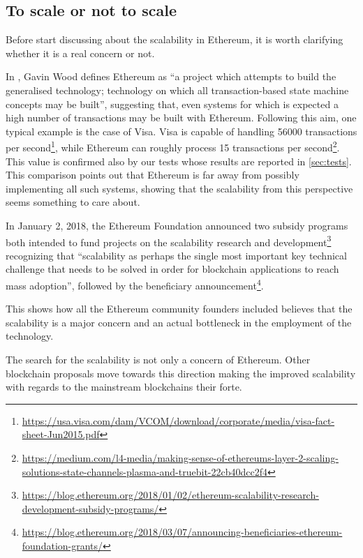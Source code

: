 \subsection{To scale or not to scale}
\label{sec:to-scale-or-not}

Before start discussing about the scalability in Ethereum, it is worth
clarifying whether it is a real concern or not.

In \cite{wood2018ethereum}, Gavin Wood defines Ethereum as ``a project which
attempts to build the generalised technology; technology on which all
transaction-based state machine concepts may be built'', suggesting that, even
systems for which is expected a high number of transactions may be built with
Ethereum. Following this aim, one typical example is the case of Visa. Visa is
capable of handling 56000 transactions per
second\footnote{\url{https://usa.visa.com/dam/VCOM/download/corporate/media/visa-fact-sheet-Jun2015.pdf}},
while Ethereum can roughly process 15 transactions per
second\footnote{\url{https://medium.com/l4-media/making-sense-of-ethereums-layer-2-scaling-solutions-state-channels-plasma-and-truebit-22cb40dcc2f4}}.
This value is confirmed also by our tests whose results are reported in
\autoref{sec:tests}. This comparison points out that Ethereum is far away from
possibly implementing all such systems, showing that the scalability from this
perspective seems something to care about.

In January 2, 2018, the Ethereum Foundation announced two subsidy programs both
intended to fund projects on the scalability research and
development\footnote{\url{https://blog.ethereum.org/2018/01/02/ethereum-scalability-research-development-subsidy-programs/}}
recognizing that ``scalability as perhaps the single most important key
technical challenge that needs to be solved in order for blockchain applications
to reach mass adoption'', followed by the beneficiary
announcement\footnote{\url{https://blog.ethereum.org/2018/03/07/announcing-beneficiaries-ethereum-foundation-grants/}}.

This shows how all the Ethereum community founders included believes that the
scalability is a major concern and an actual bottleneck in the employment of the
technology.

The search for the scalability is not only a concern of Ethereum. Other
blockchain proposals move towards this direction making the improved scalability
with regards to the mainstream blockchains their forte.
